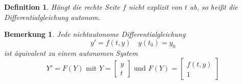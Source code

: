 \documentclass[12pt]{article}
\theoremstyle{break}
\newtheorem{definition}[theorem]{Definition}
\newtheorem{comment}[theorem]{Bemerkung}
\newtheorem*{comment*}{Bemerkung}
\begin{document}

\begin{definition}
Hängt die rechte Seite $f$ nicht explizit von $t$ ab, so heißt die Differentialgleichung autonom.
\end{definition}

\begin{comment*}
Jede nichtautonome Differentialgleichung 
$$y' = f(t, y) \quad y(t_0) = y_0$$
ist äquivalent zu einem autonomen System
$$Y' = F(Y) \text{ mit } Y = \left[\begin{matrix}y \\ t \end{matrix} \right] \text{ und } F(Y) = \left[ \begin{matrix} f(t,y) \\ 1 \end{matrix} \right]$$
\end{comment*}
\end{document}
